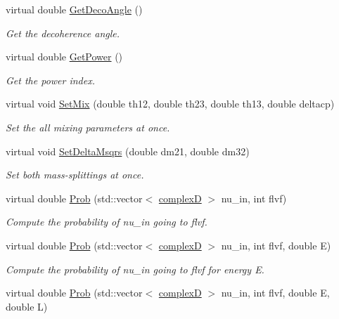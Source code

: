 \begin{DoxyCompactItemize}
virtual double \hyperlink{classOscProb_1_1PMNS__Deco_a5dadf6a39dec4a229babeff6a650179c}{Get\+Deco\+Angle} ()
\begin{DoxyCompactList}\small\item\em Get the decoherence angle. \end{DoxyCompactList}\item 
virtual double \hyperlink{classOscProb_1_1PMNS__Deco_aa40b92e0f204f499a24b18ba399b8b0e}{Get\+Power} ()
\begin{DoxyCompactList}\small\item\em Get the power index. \end{DoxyCompactList}\item 
virtual void \hyperlink{classOscProb_1_1PMNS__Fast_ad849b2231d99c5d66fb3ade8efb896e1}{Set\+Mix} (double th12, double th23, double th13, double deltacp)
\begin{DoxyCompactList}\small\item\em Set the all mixing parameters at once. \end{DoxyCompactList}\item 
virtual void \hyperlink{classOscProb_1_1PMNS__Fast_a63733b246e6d2e609ce3de7a65ba5b9f}{Set\+Delta\+Msqrs} (double dm21, double dm32)
\begin{DoxyCompactList}\small\item\em Set both mass-\/splittings at once. \end{DoxyCompactList}\item 
virtual double \hyperlink{classOscProb_1_1PMNS__Base_aa2e10704d2d205a1ec8988de14b1a66f}{Prob} (std\+::vector$<$ \hyperlink{EigenPoint_8h_a67ca8e107e20610c3fff78d5e726ece0}{complexD} $>$ nu\+\_\+in, int flvf)
\begin{DoxyCompactList}\small\item\em Compute the probability of nu\+\_\+in going to flvf. \end{DoxyCompactList}\item 
virtual double \hyperlink{classOscProb_1_1PMNS__Base_a0190a79284289aacf682c78d7cef9a81}{Prob} (std\+::vector$<$ \hyperlink{EigenPoint_8h_a67ca8e107e20610c3fff78d5e726ece0}{complexD} $>$ nu\+\_\+in, int flvf, double E)
\begin{DoxyCompactList}\small\item\em Compute the probability of nu\+\_\+in going to flvf for energy E. \end{DoxyCompactList}\item 
virtual double \hyperlink{classOscProb_1_1PMNS__Base_a01fba31729345376705e02408e835f67}{Prob} (std\+::vector$<$ \hyperlink{EigenPoint_8h_a67ca8e107e20610c3fff78d5e726ece0}{complexD} $>$ nu\+\_\+in, int flvf, double E, double L)

\end{DoxyCompactItemize}
